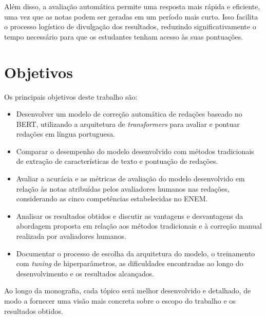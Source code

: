Além disso, a avaliação automática permite uma resposta mais rápida e eficiente, uma vez que as notas podem ser geradas em um período mais curto. Isso facilita o processo logístico de divulgação dos resultados, reduzindo significativamente o tempo necessário para que os estudantes tenham acesso às suas pontuações.

\section{Objetivos}

Os principais objetivos deste trabalho são:

\begin{itemize}
    \item Desenvolver um modelo de correção automática de redações baseado no BERT, utilizando a arquitetura de \textit{transformers} para avaliar e pontuar redações em língua portuguesa.
    \item Comparar o desempenho do modelo desenvolvido com métodos tradicionais de extração de características de texto e pontuação de redações.
    \item Avaliar a acurácia e as métricas de avaliação do modelo desenvolvido em relação às notas atribuídas pelos avaliadores humanos nas redações, considerando as cinco competências estabelecidas no ENEM.
    \item Analisar os resultados obtidos e discutir as vantagens e desvantagens da abordagem proposta em relação aos métodos tradicionais e à correção manual realizada por avaliadores humanos.
    \item Documentar o processo de escolha da arquitetura do modelo, o treinamento com \textit{tuning} de hiperparâmetros, as dificuldades encontradas ao longo do desenvolvimento e os resultados alcançados.
\end{itemize}

Ao longo da monografia, cada tópico será melhor desenvolvido e detalhado, de modo a fornecer uma visão mais concreta sobre o escopo do trabalho e os resultados obtidos.
